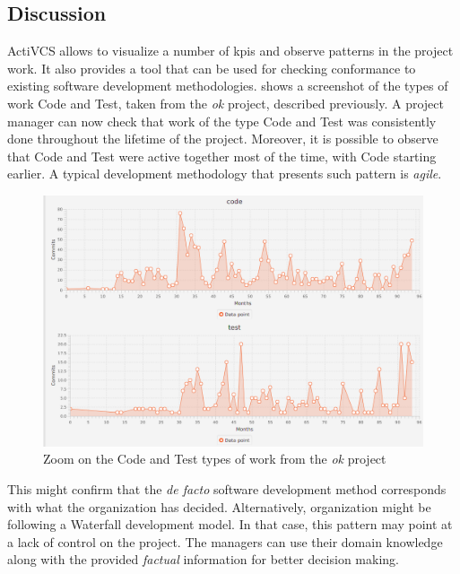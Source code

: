 \subsection{Discussion}
\label{sec:discussion}

ActiVCS allows to visualize a number of \glspl{kpi} and observe patterns in the project work. It also provides a tool that can be used for checking conformance to existing software development methodologies. 
 shows a screenshot of the types of work Code and Test, taken from the \textsl{ok} project, described previously. A project manager can now check that work of the type Code and Test was consistently done throughout the lifetime of the project. Moreover, it is possible to observe that Code and Test were active together most of the time, with Code starting earlier. A typical development methodology that presents such pattern is \emph{agile}. 
\begin{figure}[]
    \centering
    \includegraphics[width=.8\textwidth]{Project-mining-2-Mining-Type-of-Work/figures/ok-code-test}
    \caption{Zoom on the Code and Test types of work from the \textsl{ok} project}
    \label{fig:zoom}
\end{figure}


This might confirm that the \textsl{de facto} software development method corresponds with what the organization has decided. Alternatively, organization might be following a Waterfall development model. In that case, this pattern may point at a lack of control on the project. The managers can use their domain knowledge along with the provided \emph{factual} information for better decision making.



